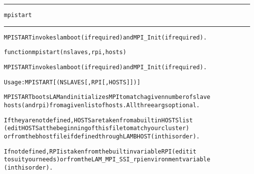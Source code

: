 \begin{samepage}
\hrule
\begin{center}
{\large \verb!mpistart!}
\label{p:mpistart}
\end{center}
\hrule\vspace{0.1in}



\begin{alltt}
MPISTART invokes lamboot (if required) and MPI_Init (if required).
\end{alltt}

\end{samepage}



\begin{samepage}


\begin{alltt}
function mpistart(nslaves, rpi, hosts) 
\end{alltt}

\end{samepage}



\begin{alltt}
MPISTART invokes lamboot (if required) and MPI_Init (if required).

   Usage: MPISTART [ ( NSLAVES [, RPI [, HOSTS] ] ) ]

   MPISTART boots LAM and initializes MPI to match a given number of slave 
   hosts (and rpi) from a given list of hosts. All three args optional.

   If they are not defined, HOSTS are taken from a builtin HOSTS list
   (edit HOSTS at the beginning of this file to match your cluster)
   or from the bhost file if defined through LAMBHOST (in this order).

   If not defined, RPI is taken from the builtin variable RPI (edit it
   to suit your needs) or from the LAM_MPI_SSI_rpi environment variable
   (in this order).
\end{alltt}






\vspace{0.1in}